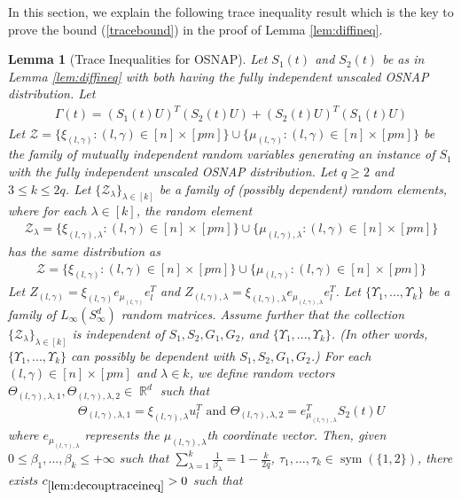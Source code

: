 \documentclass[11pt]{amsart}
\numberwithin{equation}{section}
\numberwithin{equation}{section}
\DeclareMathOperator{\R}{\mathbb{R}}
\DeclareMathOperator{\sym}{sym}
\newtheorem{lemma}[theorem]{Lemma}
\theoremstyle{remark}
\theoremstyle{definition}
\begin{document}
In this section, we explain the following trace inequality result which is the key to prove the bound (\ref{tracebound}) in the proof of Lemma \ref{lem:diffineq}.

\begin{lemma} [Trace Inequalities for OSNAP]\label{lem:decouptraceineq}
Let $S_1(t)$ and $S_2(t)$ be as in Lemma \ref{lem:diffineq} with both having the fully independent unscaled OSNAP distribution. Let
\begin{align*}\Gamma(t)=(S_1(t)U)^T(S_2(t)U)+(S_2(t)U)^T(S_1(t)U)\end{align*} Let $\mathcal{Z}=\{\xi_{(l,\gamma)}:(l,\gamma) \in [n] \times [pm]\} \cup \{\mu_{(l,\gamma)}:(l,\gamma) \in [n] \times [pm]\}$ be the family of mutually independent random variables generating an instance of $S_1$ with the fully independent  unscaled OSNAP distribution. Let $q \ge 2$ and $3 \le k \le 2q$. Let $\{\mathcal{Z}_{\lambda}\}_{\lambda \in [k]}$ be a family of (possibly dependent) random elements, where for each $\lambda \in [k]$, the random element
\begin{align*}
    \mathcal{Z}_{\lambda}=\{\xi_{(l,\gamma),\lambda}:(l,\gamma) \in [n] \times [pm]\} \cup \{\mu_{(l,\gamma),\lambda}:(l,\gamma) \in [n] \times [pm]\}
\end{align*}
has the same distribution as 
\begin{align*}
    \mathcal{Z}=\{\xi_{(l,\gamma)}:(l,\gamma) \in [n] \times [pm]\} \cup \{\mu_{(l,\gamma)}:(l,\gamma) \in [n] \times [pm]\}
\end{align*}
Let $Z_{(l,\gamma)}=\xi_{(l,\gamma)} e_{\mu_{(l, \gamma)}} e_l ^T$ and $Z_{(l,\gamma),\lambda}=\xi_{(l,\gamma),\lambda} e_{\mu_{(l, \gamma),\lambda}} e_l ^T$.
Let $\{\Upsilon_1,...,\Upsilon_k\}$ be a family of $L_{\infty}(S_{\infty}^d)$ random matrices.
Assume further that the collection $\{\mathcal{Z}_{\lambda}\}_{\lambda \in [k]}$ is independent of $S_1, S_2, G_1, G_2$, and $\{\Upsilon_1,...,\Upsilon_k\}$. (In other words, $\{\Upsilon_1,...,\Upsilon_k\}$ can possibly be dependent with $S_1, S_2, G_1, G_2$.)
For each $(l,\gamma) \in [n] \times [pm]$ and $\lambda \in k$, we define random vectors $\Theta_{(l,\gamma), \lambda, 1}, \Theta_{(l,\gamma), \lambda, 2} \in \R^d$ such that
\begin{align*}
    \Theta_{(l,\gamma), \lambda, 1} = \xi_{(l,\gamma),\lambda} u_l^T \text{ and } \Theta_{(l,\gamma), \lambda, 2} = e_{\mu_{(l,\gamma),\lambda}}^TS_2(t)U
\end{align*}
where $e_{\mu_{(l,\gamma),\lambda}}$ represents the $\mu_{(l,\gamma),\lambda}$th coordinate vector. Then, given $0 \le \beta_1,...,\beta_k \le +\infty$ such that $\sum \limits_{\lambda=1}^k \frac{1}{\beta_{\lambda}}=1-\frac{k}{2q}$, $\tau_1, \ldots, \tau_k \in \sym(\{1,2 \})$, there exists $c_{\ref*{lem:decouptraceineq}}>0$ such that

\end{lemma}
\end{document}
